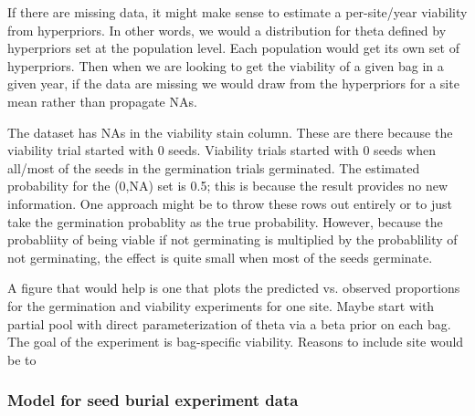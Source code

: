 \documentclass[12pt, oneside, titlepage]{article}   	%
\begin{document}
If there are missing data, it might make sense to estimate a per-site/year viability from hyperpriors. In other words, we would a distribution for theta defined by hyperpriors set at the population level. Each population would get its own set of hyperpriors. Then when we are looking to get the viability of a given bag in a given year, if the data are missing we would draw from the hyperpriors for a site mean rather than propagate NAs. 

The dataset has NAs in the viability stain column. These are there because the viability trial started with 0 seeds. Viability trials started with 0 seeds when all/most of the seeds in the germination trials germinated. The estimated probability for the (0,NA) set is 0.5; this is because the result provides no new information. One approach might be to throw these rows out entirely or to just take the germination probablity as the true probability. However, because the probabliity of being viable if not germinating is multiplied by the probablility of not germinating, the effect is quite small when most of the seeds germinate. 

A figure that would help is one that plots the predicted vs. observed proportions for the germination and viability experiments for one site. 
 Maybe start with partial pool with direct parameterization of theta via a beta prior on each bag. The goal of the experiment is bag-specific viability. Reasons to include site would be to



\subsubsection*{Model for seed burial experiment data}
\end{document}
